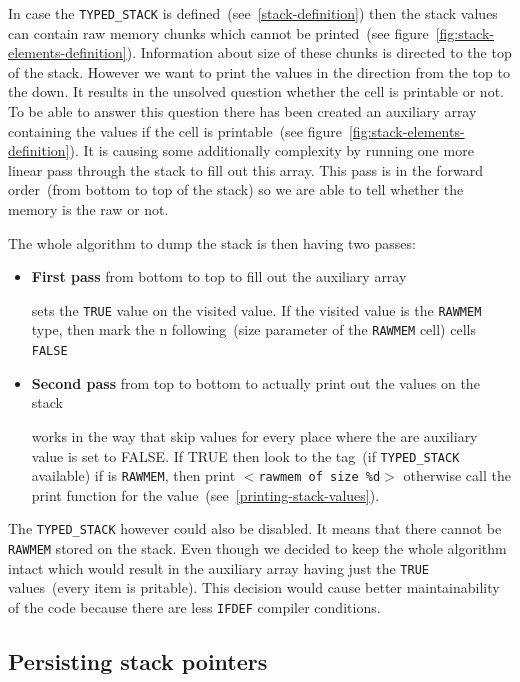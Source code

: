 \documentclass[thesis=M,english]{FITthesis}[2018/10/20]
\newcommand{\code}[1]{\texttt{#1}}
\begin{document}
In case the \code{TYPED{\_}STACK} is defined~(see~\ref{stack-definition}) then the stack values can contain raw memory chunks which cannot be printed~(see figure~\ref{fig:stack-elements-definition}). Information about size of these chunks is directed to the top of the stack. However we want to print the values in the direction from the top to the down. It results in the unsolved question whether the cell is printable or not. To be able to answer this question there has been created an auxiliary array containing the values if the cell is printable~(see figure~\ref{fig:stack-elements-definition}). It is causing some additionally complexity by running one more linear pass through the stack to fill out this array. This pass is in the forward order~(from bottom to top of the stack) so we are able to tell whether the memory is the raw or not. 

The whole algorithm to dump the stack is then having two passes:

\begin{itemize}
	\item \textbf{First pass} from bottom to top to fill out the auxiliary array
	
			sets the \code{TRUE} value on the visited value. If the visited value is the \code{RAWMEM} type, then mark the n following~(size parameter of the \code{RAWMEM} cell) cells \code{FALSE}

	\item \textbf{Second pass} from top to bottom to actually print out the values on the stack
	
			works in the way that skip values for every place where the are auxiliary value is set to FALSE. If TRUE then look to the tag~(if \code{TYPED{\_}STACK} available) if is \code{RAWMEM}, then print \code{$<$rawmem of size \%d$>$} otherwise call the print function for the value~(see~\ref{printing-stack-values}).
\end{itemize}

The \code{TYPED{\_}STACK} however could also be disabled. It means that there cannot be \code{RAWMEM} stored on the stack. Even though we decided to keep the whole algorithm intact which would result in the auxiliary array having just the \code{TRUE} values~(every item is pritable). This decision would cause better maintainability of the code because there are less \code{IFDEF} compiler conditions.

\subsection{Persisting stack pointers}\label{persisting-stack-pointers}
\end{document}
